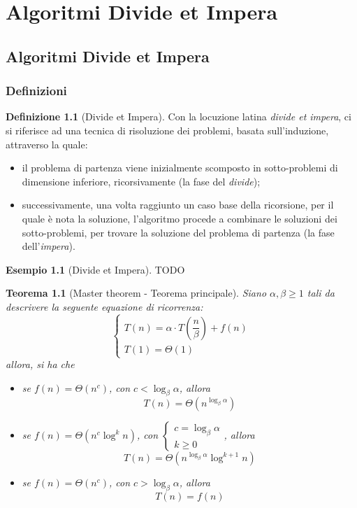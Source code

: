 \documentclass[14pt]{extreport}
\newtheorem{theorem}{Teorema}[subsection]
\theoremstyle{definition}
\newtheorem{definition}{Definizione}[subsection]
\theoremstyle{definition}
\newtheorem{example}{Esempio}[subsection]
\begin{document}
\chapter{Algoritmi Divide et Impera}

\section{Algoritmi Divide et Impera}

\subsection{Definizioni}

\begin{definition}[Divide et Impera]
    Con la locuzione latina \textit{divide et impera}, ci si riferisce ad una tecnica di risoluzione dei problemi, basata sull'induzione, attraverso la quale:

    \begin{itemize} 
        \item il problema di partenza viene inizialmente scomposto in sotto-problemi di dimensione inferiore, ricorsivamente (la fase del \textit{divide});
        \item successivamente, una volta raggiunto un caso base della ricorsione, per il quale è nota la soluzione, l'algoritmo procede a combinare le soluzioni dei sotto-problemi, per trovare la soluzione del problema di partenza (la fase dell'\textit{impera}).
    \end{itemize}
\end{definition}

\begin{example}[Divide et Impera]
    TODO
\end{example}

\begin{theorem}[Master theorem - Teorema principale]
    \label{master theorem}
    Siano $\alpha, \beta \ge 1$ tali da descrivere la seguente equazione di ricorrenza: $$\left \{ \begin{array}{l} T(n) = \alpha \cdot T\left(\dfrac{n}{\beta}\right) + f(n) \\ T(1) = \Theta(1) \end{array} \right.$$ allora, si ha che
    \begin{itemize}
        \item se $f(n) = \Theta(n^c)$, con $c < \log_{\beta}{\alpha}$, allora $$T(n) = \Theta(n^{\log_{\beta}{\alpha}})$$
        \item se $f(n) = \Theta(n^c \log^k n)$, con $\left \{ \begin{array}{l} c = \log_{\beta}{\alpha} \\ k \ge 0 \end{array} \right.$, allora $$T(n) = \Theta(n^{\log_{\beta}{\alpha}} \log^{k+1} {n})$$
        \item se $f(n) = \Theta(n^c)$, con $c > \log_{\beta}{\alpha}$, allora $$T(n) = f(n)$$
    \end{itemize}
\end{theorem}
\end{document}
